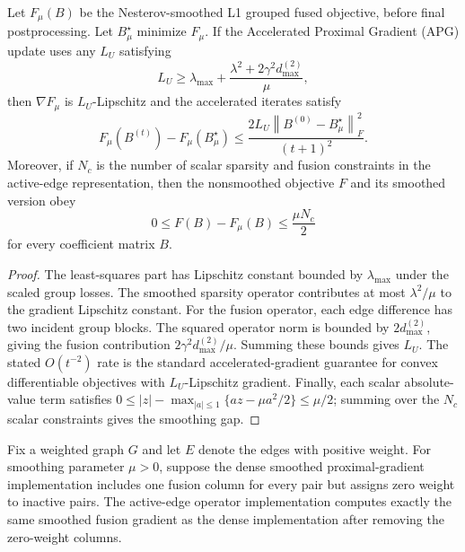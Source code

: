 \documentclass[twoside,11pt]{article}
\newcommand{\norm}[1]{\left\lVert #1 \right\rVert}
\begin{document}
\begin{proposition}
\label{prop:l1-convergence}
\leavevmode\par\noindent
Let $F_\mu(B)$ be the Nesterov-smoothed L1 grouped fused objective, before final postprocessing. 
Let $B_\mu^\star$ minimize $F_\mu$. 
If the Accelerated Proximal Gradient (APG) update uses any $L_U$ satisfying
\[
  L_U \geq
  \lambda_{\max}
  + \frac{\lambda^2+2\gamma^2 d_{\max}^{(2)}}{\mu},
\]
then $\nabla F_\mu$ is $L_U$-Lipschitz and the accelerated iterates satisfy
\[
  F_\mu(B^{(t)})-F_\mu(B_\mu^\star)
  \leq
  \frac{2L_U\norm{B^{(0)}-B_\mu^\star}_F^2}{(t+1)^2}.
\]
Moreover, if $N_c$ is the number of scalar sparsity and fusion constraints in the active-edge representation, then the nonsmoothed objective $F$ and its smoothed version obey
\[
  0 \leq F(B)-F_\mu(B) \leq \frac{\mu N_c}{2}
\]
for every coefficient matrix $B$.
\end{proposition}

\begin{proof}
The least-squares part has Lipschitz constant bounded by $\lambda_{\max}$ under the scaled group losses. 
The smoothed sparsity operator contributes at most $\lambda^2/\mu$ to the gradient Lipschitz constant. 
For the fusion operator, each edge difference has two incident group blocks. 
The squared operator norm is bounded by $2d_{\max}^{(2)}$, giving the fusion contribution $2\gamma^2 d_{\max}^{(2)}/\mu$. 
Summing these bounds gives $L_U$. 
The stated $O(t^{-2})$ rate is the standard accelerated-gradient guarantee for convex differentiable objectives with $L_U$-Lipschitz gradient. 
Finally, each scalar absolute-value term satisfies $0\leq |z|-\max_{|a|\leq 1}\{az-\mu a^2/2\}\leq\mu/2$; summing over the $N_c$ scalar constraints gives the smoothing gap.
\end{proof}

\begin{proposition}
\label{prop:l1-equivalence}
\leavevmode\par\noindent
Fix a weighted graph $G$ and let $E$ denote the edges with positive weight.
For smoothing parameter $\mu>0$, suppose the dense smoothed proximal-gradient implementation includes one fusion column for every pair but assigns zero weight to inactive pairs. 
The active-edge operator implementation computes exactly the same smoothed fusion gradient as the dense implementation after removing the zero-weight columns.
\end{proposition}
\end{document}
